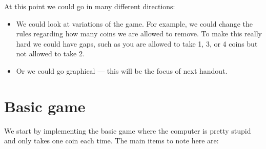 \documentclass{coderdojo}
\begin{document}
At this point we could go in many different directions:
\begin{itemize}
\item
We could look at variations of the game. For example, we could change the rules regarding how many coins we are allowed to remove. To make this really hard we could have gaps, such as you are allowed to take 1, 3, or 4 coins but not allowed to take 2.
\item
Or we could go graphical --- this will be the focus of next handout.
\end{itemize}

%
%
%



\section{Basic game}\label{sec:basic}

We start by implementing the basic game where the computer is pretty stupid and only takes one coin each time. The main 
items to note here are:
\end{document}
